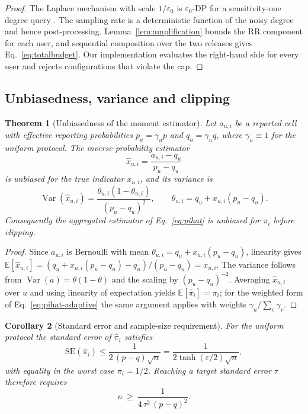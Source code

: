 \documentclass[pdflatex,sn-basic,Numbered]{sn-jnl}
\theoremstyle{plain}
\newtheorem{theorem}{Theorem}
\newtheorem{corollary}[theorem]{Corollary}
\theoremstyle{remark}
\theoremstyle{definition}
\newcommand{\eps}{\varepsilon}
\newcommand{\E}{\mathbb{E}}
\newcommand{\Var}{\operatorname{Var}}
\begin{document}
\begin{proof}
The Laplace mechanism with scale $1/\eps_0$ is $\eps_0$-DP for a sensitivity-one degree query \cite{dwork2006calibrating}. The sampling rate is a deterministic function of the noisy degree and hence post-processing. Lemma~\ref{lem:amplification} bounds the RR component for each user, and sequential composition over the two releases gives Eq.~\eqref{eq:totalbudget}. Our implementation evaluates the right-hand side for every user and rejects configurations that violate the cap.
\end{proof}

\subsection{Unbiasedness, variance and clipping}\label{sec:utility-theory}

\begin{theorem}[Unbiasedness of the moment estimator]\label{thm:unbiased}
Let $a_{u,i}$ be a reported cell with effective reporting probabilities $p_u=\gamma_u p$ and $q_u=\gamma_u q$, where $\gamma_u\equiv1$ for the uniform protocol. The inverse-probability estimator
\begin{equation}\label{eq:xhat}
\hat x_{u,i}=\frac{a_{u,i}-q_u}{p_u-q_u}
\end{equation}
is unbiased for the true indicator $x_{u,i}$, and its variance is
\begin{equation}\label{eq:varx}
\Var(\hat x_{u,i})=\frac{\theta_{u,i}(1-\theta_{u,i})}{(p_u-q_u)^{2}},
\qquad \theta_{u,i}=q_u+x_{u,i}(p_u-q_u).
\end{equation}
Consequently the aggregated estimator of Eq.~\eqref{eq:pihat} is unbiased for $\pi_i$ before clipping.
\end{theorem}

\begin{proof}
Since $a_{u,i}$ is Bernoulli with mean $\theta_{u,i}=q_u+x_{u,i}(p_u-q_u)$, linearity gives $\E[\hat x_{u,i}]=(q_u+x_{u,i}(p_u-q_u)-q_u)/(p_u-q_u)=x_{u,i}$. The variance follows from $\Var(a)=\theta(1-\theta)$ and the scaling by $(p_u-q_u)^{-2}$. Averaging $\hat x_{u,i}$ over $u$ and using linearity of expectation yields $\E[\hat\pi_i]=\pi_i$; for the weighted form of Eq.~\eqref{eq:pihat-adaptive} the same argument applies with weights $\gamma_u/\sum_v\gamma_v$.
\end{proof}

\begin{corollary}[Standard error and sample-size requirement]\label{cor:se}
For the uniform protocol the standard error of $\hat\pi_i$ satisfies
\begin{equation}\label{eq:se}
\mathrm{SE}(\hat\pi_i)\le\frac{1}{2\,(p-q)\sqrt{n}}=\frac{1}{2\tanh(\eps/2)\sqrt{n}} ,
\end{equation}
with equality in the worst case $\pi_i=1/2$. Reaching a target standard error $\tau$ therefore requires
\begin{equation}\label{eq:nreq}
n\ \ge\ \frac{1}{4\,\tau^{2}\,(p-q)^{2}} .
\end{equation}
\end{corollary}
\end{document}
